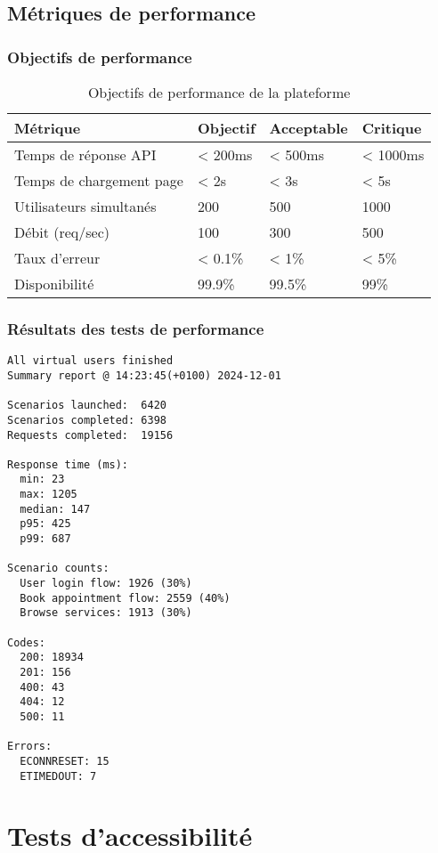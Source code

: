 \subsection{Métriques de performance}

\subsubsection{Objectifs de performance}

\begin{table}[H]
\centering
\caption{Objectifs de performance de la plateforme}
\begin{tabular}{|l|l|l|l|}
\hline
\textbf{Métrique} & \textbf{Objectif} & \textbf{Acceptable} & \textbf{Critique} \\
\hline
Temps de réponse API & < 200ms & < 500ms & < 1000ms \\
Temps de chargement page & < 2s & < 3s & < 5s \\
Utilisateurs simultanés & 200 & 500 & 1000 \\
Débit (req/sec) & 100 & 300 & 500 \\
Taux d'erreur & < 0.1\% & < 1\% & < 5\% \\
Disponibilité & 99.9\% & 99.5\% & 99\% \\
\hline
\end{tabular}
\end{table}

\subsubsection{Résultats des tests de performance}

\begin{lstlisting}[caption=Résultats Artillery]
All virtual users finished
Summary report @ 14:23:45(+0100) 2024-12-01

Scenarios launched:  6420
Scenarios completed: 6398
Requests completed:  19156

Response time (ms):
  min: 23
  max: 1205
  median: 147
  p95: 425
  p99: 687

Scenario counts:
  User login flow: 1926 (30%)
  Book appointment flow: 2559 (40%)
  Browse services: 1913 (30%)

Codes:
  200: 18934
  201: 156
  400: 43
  404: 12
  500: 11

Errors:
  ECONNRESET: 15
  ETIMEDOUT: 7
\end{lstlisting}

\section{Tests d'accessibilité}

